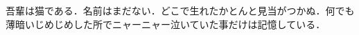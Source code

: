\begin{jabstract}
	吾輩は猫である．名前はまだない．どこで生れたかとんと見当がつかぬ．何でも薄暗いじめじめした所でニャーニャー泣いていた事だけは記憶している．
\end{jabstract}
